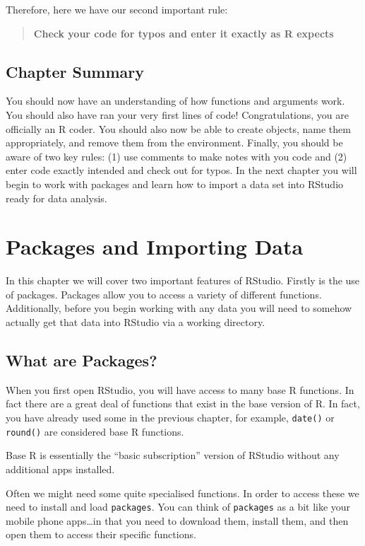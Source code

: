 \documentclass[
]{book}
\let\oldsection\section
\renewcommand{\section}{\needspace{5\baselineskip}\oldsection}
\begin{document}
Therefore, here we have our second important rule:

\begin{quote}
\textbf{Check your code for typos and enter it exactly as R expects}
\end{quote}

\section{Chapter Summary}\label{chapter-summary-1}

You should now have an understanding of how functions and arguments work. You should also have ran your very first lines of code! Congratulations, you are officially an R coder. You should also now be able to create objects, name them appropriately, and remove them from the environment. Finally, you should be aware of two key rules: (1) use comments to make notes with you code and (2) enter code exactly intended and check out for typos. In the next chapter you will begin to work with packages and learn how to import a data set into RStudio ready for data analysis.

\chapter{Packages and Importing Data}\label{packages-and-importing-data}

In this chapter we will cover two important features of RStudio. Firstly is the use of packages. Packages allow you to access a variety of different functions. Additionally, before you begin working with any data you will need to somehow actually get that data into RStudio via a working directory.

\section{What are Packages?}\label{what-are-packages}

When you first open RStudio, you will have access to many base R functions. In fact there are a great deal of functions that exist in the base version of R. In fact, you have already used some in the previous chapter, for example, \texttt{date()} or \texttt{round()} are considered base R functions.

Base R is essentially the ``basic subscription'' version of RStudio without any additional apps installed.

Often we might need some quite specialised functions. In order to access these we need to install and load \texttt{packages}. You can think of \texttt{packages} as a bit like your mobile phone apps\ldots in that you need to download them, install them, and then open them to access their specific functions.
\end{document}
